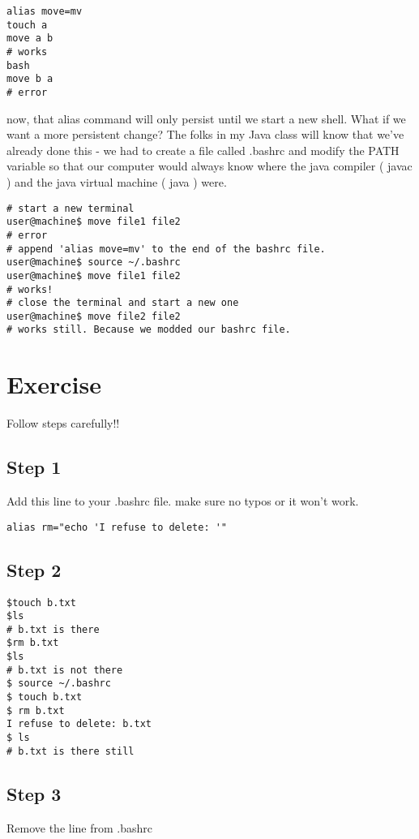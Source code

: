 \documentclass[10pt]{article}
\begin{document}
\begin{lstlisting}[style=term]
alias move=mv
touch a
move a b
# works
bash
move b a
# error
\end{lstlisting}

now, that alias command will only persist until we start a new shell. What if we
want a more persistent change? The folks in my Java class will know that we've
already done this - we had to create a file called .bashrc and modify the PATH
variable so that our computer would always know where the java compiler ( javac
) and the java virtual machine ( java ) were.

\begin{lstlisting}[style=term]
# start a new terminal
user@machine$ move file1 file2
# error
# append 'alias move=mv' to the end of the bashrc file.
user@machine$ source ~/.bashrc
user@machine$ move file1 file2
# works!
# close the terminal and start a new one
user@machine$ move file2 file2
# works still. Because we modded our bashrc file.
\end{lstlisting}

\section{{\color{red} Exercise}}
Follow steps carefully!!

\subsection{ Step 1 }
Add this line to your .bashrc file. make sure no typos or it won't work.

\begin{lstlisting}[style=term]
alias rm="echo 'I refuse to delete: '" 
\end{lstlisting}

\subsection{ Step 2}
\begin{lstlisting}[style=term]
$touch b.txt
$ls
# b.txt is there
$rm b.txt
$ls
# b.txt is not there
$ source ~/.bashrc
$ touch b.txt
$ rm b.txt
I refuse to delete: b.txt
$ ls
# b.txt is there still
\end{lstlisting}

\subsection{Step 3}
Remove the line from .bashrc
\end{document}
